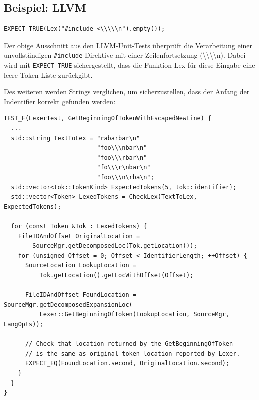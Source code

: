 \documentclass[a4paper,11pt]{article}
\begin{document}
\subsection{Beispiel: LLVM}

\begin{verbatim}
EXPECT_TRUE(Lex("#include <\\\\\n").empty());
\end{verbatim}

Der obige Ausschnitt aus den LLVM-Unit-Tests überprüft die Verarbeitung einer unvollständigen \texttt{\#include}-Direktive mit einer Zeilenfortsetzung (\textbackslash  \textbackslash \textbackslash \textbackslash n). Dabei wird mit \texttt{EXPECT\_TRUE} sichergestellt, dass die Funktion Lex für diese Eingabe eine leere Token-Liste zurückgibt. \parencite{llvm_lexer_test}

Des weiteren werden Strings verglichen, um sicherzustellen, dass der Anfang der Indentifier korrekt gefunden werden:

\begin{verbatim}
TEST_F(LexerTest, GetBeginningOfTokenWithEscapedNewLine) {
  ...
  std::string TextToLex = "rabarbar\n"
                          "foo\\\nbar\n"
                          "foo\\\rbar\n"
                          "fo\\\r\nbar\n"
                          "foo\\\n\rba\n";
  std::vector<tok::TokenKind> ExpectedTokens{5, tok::identifier};
  std::vector<Token> LexedTokens = CheckLex(TextToLex, ExpectedTokens);

  for (const Token &Tok : LexedTokens) {
    FileIDAndOffset OriginalLocation =
        SourceMgr.getDecomposedLoc(Tok.getLocation());
    for (unsigned Offset = 0; Offset < IdentifierLength; ++Offset) {
      SourceLocation LookupLocation =
          Tok.getLocation().getLocWithOffset(Offset);

      FileIDAndOffset FoundLocation = SourceMgr.getDecomposedExpansionLoc(
          Lexer::GetBeginningOfToken(LookupLocation, SourceMgr, LangOpts));

      // Check that location returned by the GetBeginningOfToken
      // is the same as original token location reported by Lexer.
      EXPECT_EQ(FoundLocation.second, OriginalLocation.second);
    }
  }
}

\end{verbatim}
\end{document}
